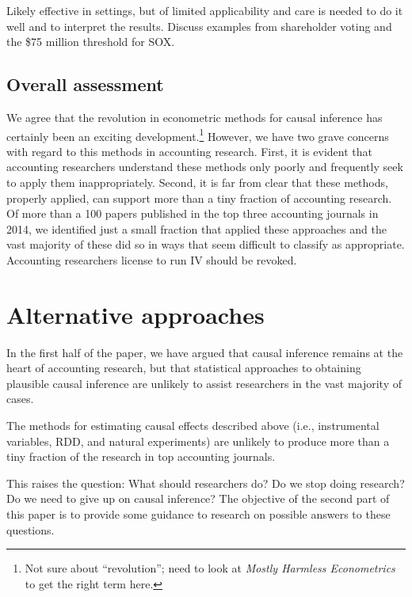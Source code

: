 \documentclass[11pt]{amsart}
\begin{document}
\newpage

Likely effective in settings, but of limited applicability and care is needed to do it well and to interpret the results. Discuss examples from shareholder voting and the \$75 million threshold for SOX.

\subsection{Overall assessment}

We agree that the revolution in econometric methods for causal inference has certainly been an exciting development.\footnote{Not sure about ``revolution''; need to look at \emph{Mostly Harmless Econometrics} to get the right term here.} However, we have two grave concerns with regard to this methods in accounting research. First, it is evident that accounting researchers understand these methods only poorly and frequently seek to apply them inappropriately. Second,  it is far from clear that these methods, properly applied, can support more than a tiny fraction of accounting research. Of more than a 100 papers published in the top three accounting journals in 2014, we identified just a small fraction that applied these approaches and the vast majority of these did so in ways that seem difficult to classify as appropriate. Accounting researchers license to run IV should be revoked.

\section{Alternative approaches}

In the first half of the paper, we have argued that causal inference remains at the heart of accounting research, but that statistical approaches to obtaining plausible causal inference are unlikely to assist researchers in the vast majority of cases.

The methods for estimating causal effects described above (i.e., instrumental variables, RDD, and natural experiments) are unlikely to produce more than a tiny fraction of the research in top accounting journals.

This raises the question: What should researchers do? Do we stop doing research? Do we need to give up on causal inference? The objective of the second part of this paper is to provide some guidance to research on possible answers to these questions.


\end{document}
